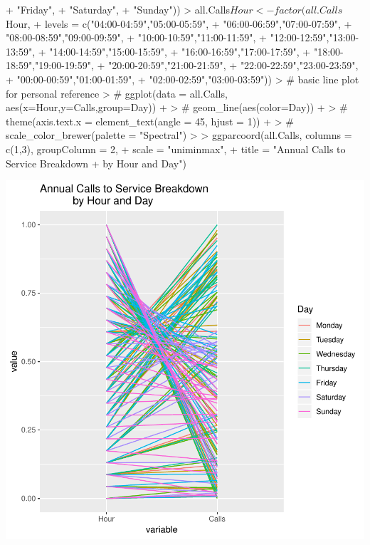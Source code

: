 \documentclass[12pt,letterpaper,final]{article}
\begin{document}
\begin{enumerate}
\begin{enumerate}
\begin{Schunk}
\begin{Sinput}
+                                    "Friday", 
+                                    "Saturday", 
+                                    "Sunday"))
> all.Calls$Hour <- factor(all.Calls$Hour,
+                          levels = c("04:00-04:59","05:00-05:59",
+                                     "06:00-06:59","07:00-07:59",
+                                     "08:00-08:59","09:00-09:59",
+                                     "10:00-10:59","11:00-11:59",
+                                     "12:00-12:59","13:00-13:59",
+                                     "14:00-14:59","15:00-15:59",
+                                     "16:00-16:59","17:00-17:59",
+                                     "18:00-18:59","19:00-19:59",
+                                     "20:00-20:59","21:00-21:59",
+                                     "22:00-22:59","23:00-23:59",
+                                     "00:00-00:59","01:00-01:59",
+                                     "02:00-02:59","03:00-03:59"))
> # basic line plot for personal reference
> # ggplot(data = all.Calls, aes(x=Hour,y=Calls,group=Day)) + 
> #   geom_line(aes(color=Day)) + 
> #   theme(axis.text.x = element_text(angle = 45, hjust = 1)) + 
> #   scale_color_brewer(palette = "Spectral")
> 
> ggparcoord(all.Calls, columns = c(1,3), groupColumn = 2, 
+            scale = "uniminmax", 
+            title = "Annual Calls to Service Breakdown 
+            by Hour and Day")
\end{Sinput}
\end{Schunk}
\includegraphics{hw01_bartschi-012}


\end{enumerate}
\end{enumerate}
\end{document}
